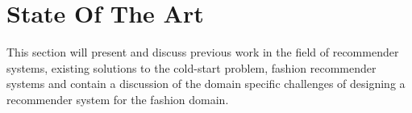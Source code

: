 
\chapter{State Of The Art}
\minitoc
\label{chapter:SotA}
This section will present and discuss previous work in the field of recommender
systems, existing solutions to the cold-start problem, fashion recommender
systems and contain a discussion of the domain specific challenges of designing
a recommender system for the fashion domain.

\clearpage





% 
